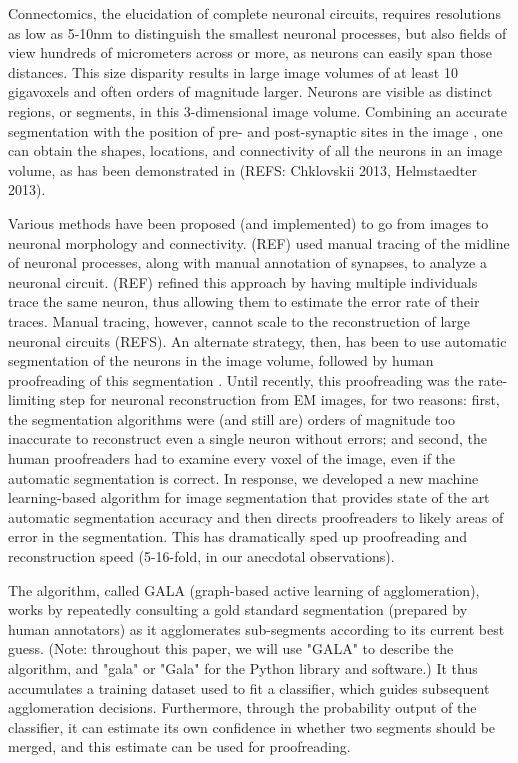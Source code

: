 \documentclass{frontiersSCNS} %
\begin{document}
Connectomics, the elucidation of complete neuronal circuits, requires resolutions as low as 5-10nm to distinguish the smallest neuronal processes, but also fields of view hundreds of micrometers across or more, as neurons can easily span those distances.
This size disparity results in large image volumes of at least 10 gigavoxels and often orders of magnitude larger.
Neurons are visible as distinct regions, or segments, in this 3-dimensional image volume.
Combining an accurate segmentation with the position of pre- and post-synaptic sites in the image \citep{Kreshuk:2011el, Jagadeesh:2013wn}, one can obtain the shapes, locations, and connectivity of all the neurons in an image volume, as has been demonstrated in (REFS: Chklovskii 2013, Helmstaedter 2013).

Various methods have been proposed (and implemented) to go from images to neuronal morphology and connectivity.
(REF) used manual tracing of the midline of neuronal processes, along with manual annotation of synapses, to analyze a neuronal circuit.
(REF) refined this approach by having multiple individuals trace the same neuron, thus allowing them to estimate the error rate of their traces.
Manual tracing, however, cannot scale to the reconstruction of large neuronal circuits (REFS).
An alternate strategy, then, has been to use automatic segmentation of the neurons in the image volume, followed by human proofreading of this segmentation \citep{Chklovskii:2010df}.
Until recently, this proofreading was the rate-limiting step for neuronal reconstruction from EM images, for two reasons:
first, the segmentation algorithms were (and still are) orders of magnitude too inaccurate to reconstruct even a single neuron without errors;
and second, the human proofreaders had to examine every voxel of the image, even if the automatic segmentation is correct.
In response, we developed a new machine learning-based algorithm for image segmentation \citep{NunezIglesias:2013cd} that provides state of the art automatic segmentation accuracy and then directs proofreaders to likely areas of error in the segmentation.
This has dramatically sped up proofreading and reconstruction speed (5-16-fold, in our anecdotal observations).

The algorithm, called GALA (graph-based active learning of agglomeration), works by repeatedly consulting a gold standard segmentation (prepared by human annotators) as it agglomerates sub-segments according to its current best guess.
(Note: throughout this paper, we will use "GALA" to describe the algorithm, and "gala" or "Gala" for the Python library and software.)
It thus accumulates a training dataset used to fit a classifier, which guides subsequent agglomeration decisions.
Furthermore, through the probability output of the classifier, it can estimate its own confidence in whether two segments should be merged, and this estimate can be used for proofreading.
\end{document}
